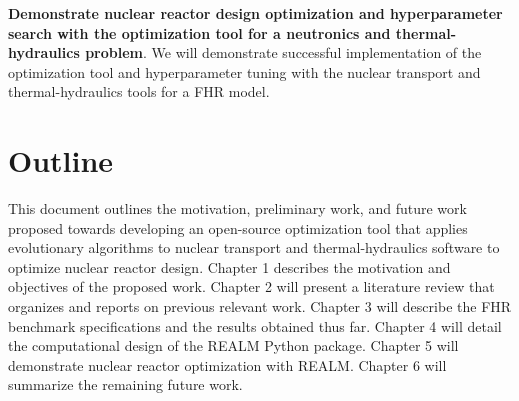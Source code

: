 \vspace{0.2cm} 
\noindent
\textbf{Demonstrate nuclear reactor design optimization and hyperparameter 
search with the optimization tool for a neutronics and thermal-hydraulics problem}.
We will demonstrate successful implementation of the optimization tool and 
hyperparameter tuning with the nuclear transport and thermal-hydraulics tools 
for a \gls{FHR} model.  


\section{Outline}
This document outlines the motivation, preliminary work, and future work proposed 
towards developing an open-source optimization tool that applies evolutionary 
algorithms to nuclear transport and thermal-hydraulics software to optimize 
nuclear reactor design. 
Chapter 1 describes the motivation and objectives of the proposed work. 
Chapter 2 will present a literature review that organizes and reports on previous 
relevant work. 
Chapter 3 will describe the \gls{FHR} benchmark specifications and the results 
obtained thus far. 
Chapter 4 will detail the computational design of the REALM Python package. 
Chapter 5 will demonstrate nuclear reactor optimization with REALM. 
Chapter 6 will summarize the remaining future work. 
